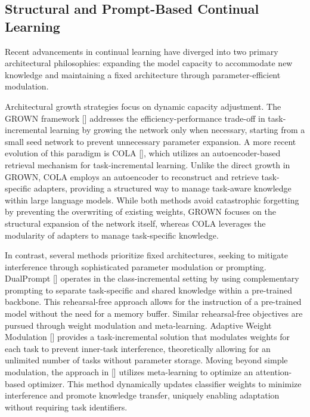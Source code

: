 \documentclass[11pt]{article}
\begin{document}
\subsection{Structural and Prompt-Based Continual Learning}

Recent advancements in continual learning have diverged into two primary architectural philosophies: expanding the model capacity to accommodate new knowledge and maintaining a fixed architecture through parameter-efficient modulation.

Architectural growth strategies focus on dynamic capacity adjustment. The GROWN framework [\citep{2110.00908}] addresses the efficiency-performance trade-off in task-incremental learning by growing the network only when necessary, starting from a small seed network to prevent unnecessary parameter expansion. A more recent evolution of this paradigm is COLA [\citep{2510.21836}], which utilizes an autoencoder-based retrieval mechanism for task-incremental learning. Unlike the direct growth in GROWN, COLA employs an autoencoder to reconstruct and retrieve task-specific adapters, providing a structured way to manage task-aware knowledge within large language models. While both methods avoid catastrophic forgetting by preventing the overwriting of existing weights, GROWN focuses on the structural expansion of the network itself, whereas COLA leverages the modularity of adapters to manage task-specific knowledge.

In contrast, several methods prioritize fixed architectures, seeking to mitigate interference through sophisticated parameter modulation or prompting. DualPrompt [\citep{2204.04799}] operates in the class-incremental setting by using complementary prompting to separate task-specific and shared knowledge within a pre-trained backbone. This rehearsal-free approach allows for the instruction of a pre-trained model without the need for a memory buffer. Similar rehearsal-free objectives are pursued through weight modulation and meta-learning. Adaptive Weight Modulation [\citep{2311.15276}] provides a task-incremental solution that modulates weights for each task to prevent inner-task interference, theoretically allowing for an unlimited number of tasks without parameter storage. Moving beyond simple modulation, the approach in [\citep{2408.03219}] utilizes meta-learning to optimize an attention-based optimizer. This method dynamically updates classifier weights to minimize interference and promote knowledge transfer, uniquely enabling adaptation without requiring task identifiers.
\end{document}
